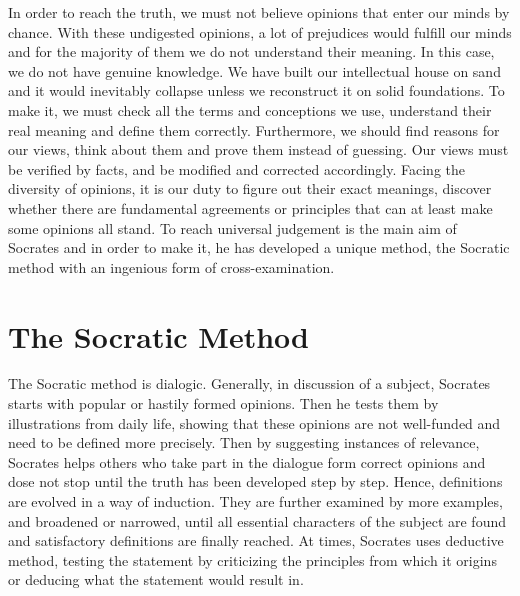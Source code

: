 \documentclass[11pt]{article}
\begin{document}
In order to reach the truth, we must not believe opinions that enter our minds by chance. 
With these undigested opinions, a lot of prejudices would fulfill our minds and for the majority of them we do not understand their meaning. 
In this case, we do not have genuine knowledge. 
We have built our intellectual house on sand and it would inevitably collapse unless we reconstruct it on solid foundations. 
To make it, we must check all the terms and conceptions we use, understand their real meaning and define them correctly. 
Furthermore, we should find reasons for our views, think about them and prove them instead of guessing. 
Our views must be verified by facts, and be modified and corrected accordingly. 
Facing the diversity of opinions, it is our duty to figure out their exact meanings, discover whether there are fundamental agreements or principles that can at least make some opinions all stand. 
To reach universal judgement is the main aim of Socrates and in order to make it, he has developed a unique method, the Socratic method with an ingenious form of cross-examination.
  
\section{The Socratic Method}
The Socratic method is dialogic. 
Generally, in discussion of a subject, Socrates starts with popular or hastily formed opinions. 
Then he tests them by illustrations from daily life, showing that these opinions are not well-funded and need to be defined more precisely. 
Then by suggesting instances of relevance, Socrates helps others who take part in the dialogue form correct opinions and dose not stop until the truth has been developed step by step.
Hence, definitions are evolved in a way of induction. 
They are further examined by more examples, and broadened or narrowed, until all essential characters of the subject are found and satisfactory definitions are finally reached. 
At times, Socrates uses deductive method, testing the statement by criticizing the principles from which it origins or deducing what the statement would result in.

\newline
\end{document}
